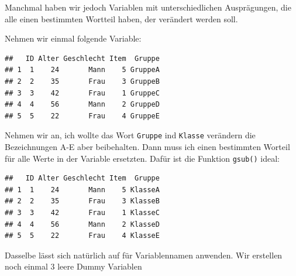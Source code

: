 \documentclass[
]{book}
\newenvironment{Shaded}{\begin{snugshade}}{\end{snugshade}}
\newcommand{\AttributeTok}[1]{\textcolor[rgb]{0.77,0.63,0.00}{#1}}
\newcommand{\FunctionTok}[1]{\textcolor[rgb]{0.00,0.00,0.00}{#1}}
\newcommand{\NormalTok}[1]{#1}
\newcommand{\OtherTok}[1]{\textcolor[rgb]{0.56,0.35,0.01}{#1}}
\newcommand{\SpecialCharTok}[1]{\textcolor[rgb]{0.00,0.00,0.00}{#1}}
\newcommand{\StringTok}[1]{\textcolor[rgb]{0.31,0.60,0.02}{#1}}
\begin{document}
Manchmal haben wir jedoch Variablen mit unterschiedlichen Ausprägungen, die alle einen bestimmten Wortteil haben, der verändert werden soll.

Nehmen wir einmal folgende Variable:

\begin{Shaded}
\end{Shaded}

\begin{verbatim}
##   ID Alter Geschlecht Item  Gruppe
## 1  1    24       Mann    5 GruppeA
## 2  2    35       Frau    3 GruppeB
## 3  3    42       Frau    1 GruppeC
## 4  4    56       Mann    2 GruppeD
## 5  5    22       Frau    4 GruppeE
\end{verbatim}

Nehmen wir an, ich wollte das Wort \texttt{Gruppe} ind \texttt{Klasse} verändern die Bezeichnungen A-E aber beibehalten. Dann muss ich einen bestimmten Worteil für alle Werte in der Variable ersetzten. Dafür ist die Funktion \texttt{gsub()} ideal:

\begin{Shaded}
\end{Shaded}

\begin{verbatim}
##   ID Alter Geschlecht Item  Gruppe
## 1  1    24       Mann    5 KlasseA
## 2  2    35       Frau    3 KlasseB
## 3  3    42       Frau    1 KlasseC
## 4  4    56       Mann    2 KlasseD
## 5  5    22       Frau    4 KlasseE
\end{verbatim}

Dasselbe lässt sich natürlich auf für Variablennamen anwenden. Wir erstellen noch einmal 3 leere Dummy Variablen
\end{document}
